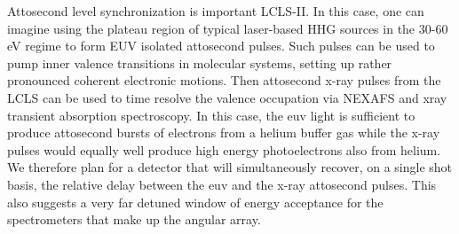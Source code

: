 Attosecond level synchronization is important LCLS-II.
In this case, one can imagine using the plateau region of typical laser-based HHG sources in the 30-60 eV regime to form EUV isolated attosecond pulses.
Such pulses can be used to pump inner valence transitions in molecular systems, setting up rather pronounced coherent electronic motions.
Then attosecond x-ray pulses from the LCLS can be used to time resolve the valence occupation via NEXAFS and xray transient absorption spectroscopy.
In this case, the euv light is sufficient to produce attosecond bursts of electrons from a helium buffer gas while the x-ray pulses would equally well produce high energy photoelectrons also from helium.
We therefore plan for a detector that will simultaneously recover, on a single shot basis, the relative delay between the euv and the x-ray attosecond pulses.
This also suggests a very far detuned window of energy acceptance for the spectrometers that make up the angular array.

